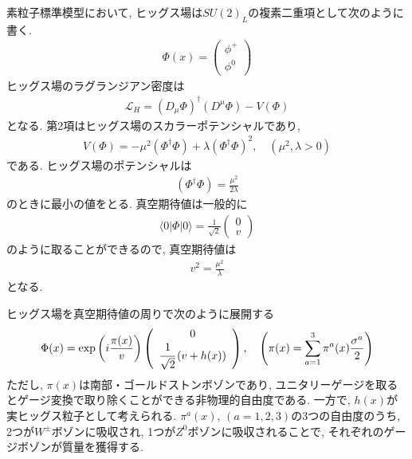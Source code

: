 素粒子標準模型において, ヒッグス場は$SU(2)_L$の複素二重項として次のように書く.
\begin{align}
  \Phi(x) = \left(
  \begin{array}{c}
    \phi^+ \\
    \phi^0
  \end{array}
  \right)
\end{align}
ヒッグス場のラグランジアン密度は
\begin{align}
  \mathcal{L}_H = \left(D_\mu \Phi\right)^\dagger (D^\mu \Phi) -V(\Phi) \label{L_H}
\end{align}
となる.
第2項はヒッグス場のスカラーポテンシャルであり,
\begin{align}
  V(\Phi) = -\mu^2 (\Phi^\dagger\Phi)+ {\lambda}(\Phi^\dagger \Phi)^2,\quad(\mu^2, \lambda>0)\label{V_H}
\end{align}
である.
ヒッグス場のポテンシャルは
\begin{align}
  (\Phi^\dagger \Phi) = \frac{\mu^2}{2\lambda}\nonumber
\end{align}
のときに最小の値をとる.
真空期待値は一般的に
\begin{align}
  \langle 0 |\Phi |0\rangle = \frac{1}{\sqrt{2}}\left(\begin{array}{c}
      0 \\
      v
  \end{array}\right)\label{Higgs_VEV}
\end{align}
のように取ることができるので, 真空期待値は
\begin{align}
  v^2 = \frac{\mu^2}{\lambda}\nonumber
\end{align}
となる.

ヒッグス場を真空期待値の周りで次のように展開する
\begin{align}
  \Phi(x) = \exp\left(i\frac{\pi(x)}{v}\right)\left(
  \begin{array}{c}
    0 \\
    \cfrac{1}{\sqrt{2}}\left(v + h(x)\right)
  \end{array}
\right),\quad \left(\pi(x) = \sum_{a=1}^3\pi^a(x)\frac{\sigma^a}{2}\right)\label{higgs}
\end{align}
ただし, $\pi(x)$は南部・ゴールドストンボゾンであり, ユニタリーゲージを取るとゲージ変換で取り除くことができる非物理的自由度である.
一方で, $h(x)$が実ヒッグス粒子として考えられる.
$\pi^a(x),\,(a=1,2,3)$の3つの自由度のうち,  2つが$W^\pm$ボゾンに吸収され, 1つが$Z^0$ボゾンに吸収されることで, それぞれのゲージボゾンが質量を獲得する.

